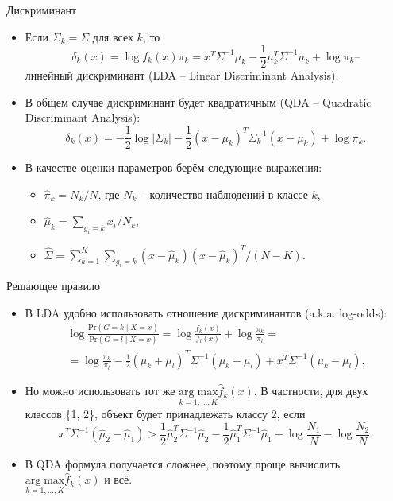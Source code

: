 \documentclass[9pt]{beamer}
\begin{document}
\begin{frame}{Дискриминант}
\begin{itemize}
    \item Если $\Sigma_k = \Sigma$ для всех $k$, то
    $$\delta_k(x) = \log f_k(x)\pi_k = x^T\Sigma^{-1}\mu_k -\frac{1}{2}\mu_k^T\Sigma^{-1}\mu_k + 
    \log\pi_k \text{--}$$
    линейный дискриминант (LDA -- Linear Discriminant Analysis).
    \item В общем случае дискриминант будет квадратичным (QDA -- Quadratic Discriminant Analysis):
    $$\delta_k(x) = -\frac{1}{2}\log |\Sigma_k| -\frac{1}{2}(x-\mu_k)^T\Sigma_k^{-1}(x-\mu_k) + \log\pi_k.$$
    \item В качестве оценки параметров берём следующие выражения:
    \begin{itemize}
        \item $\hat \pi_k = N_k/N$, где $N_k$ -- количество наблюдений в классе $k$,
        \item $\hat \mu_k = \sum_{g_i = k}x_i / N_k$,
        \item $\hat \Sigma = \sum_{k=1}^K\sum_{g_i = k} (x-\hat\mu_k)(x-\hat\mu_k)^T/(N-K)$.
    \end{itemize}
\end{itemize}
\end{frame}

\begin{frame}{Решающее правило}
    \begin{itemize}
        \item В LDA удобно использовать отношение дискриминантов (a.k.a. log-odds):
        \begin{equation*}
        \begin{split}
            \log \frac{\text{Pr}(G=k \;|\; X = x)}{\text{Pr}(G=l \;|\; X = x)} = \log \frac{f_k(x)}{f_l(x)} + \log \frac{\pi_k}{\pi_l} = \\
            = \log \frac{\pi_k}{\pi_l} - \frac{1}{2}(\mu_k + \mu_l)^T\Sigma^{-1}(\mu_k-\mu_l) + x^T\Sigma^{-1}(\mu_k - \mu_l).
        \end{split}
        \end{equation*}
        \item Но можно использовать тот же $\underset{k=1,\ldots,K}{\mathrm{arg\;max}}\hat f_k(x)$. В частности, для двух классов \{1, 2\}, объект будет принадлежать классу 2, если
        $$x^T\Sigma^{-1}(\hat\mu_2-\hat\mu_1) > \frac{1}{2}\hat\mu_2^T\Sigma^{-1}\hat\mu_2 - \frac{1}{2}\hat\mu_1^T\Sigma^{-1}\hat\mu_1 + \log \frac{N_1}{N} - \log\frac{N_2}{N}.$$
        \item В QDA формула получается сложнее, поэтому проще вычислить $\underset{k=1,\ldots,K}{\mathrm{arg\;max}}\hat f_k(x)$ и всё.
    \end{itemize}
\end{frame}
\end{document}
